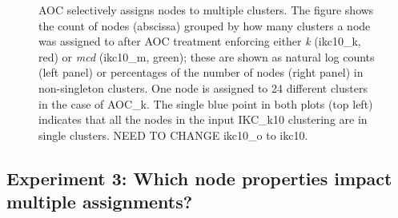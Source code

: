 \documentclass[12pt, oneside]{article}   	%
\begin{document}
\begin{figure}[H]
\begin{subfigure}[t]{0.48\textwidth}
    	\end{subfigure}
\captionsetup{width=0.9\textwidth}	
\caption{AOC selectively assigns nodes to multiple clusters. The figure shows the count of nodes (abscissa) grouped by how many clusters a node was assigned to after AOC treatment enforcing either \emph{k} (ikc10\_k, red) or \emph{mcd} (ikc10\_m, green);  these are shown as natural log counts (left panel) or percentages of the number of nodes (right panel) in non-singleton clusters. One node is assigned to 24 different clusters in the case of AOC\_k. The single blue point in both plots (top left) indicates that all the nodes in the input IKC\_k10 clustering are in single clusters. NEED TO CHANGE ikc10\_o to ikc10.}
\label{fig:fig2}
\end{figure}

\subsection{Experiment 3: Which node properties impact multiple assignments?}
\end{document}
